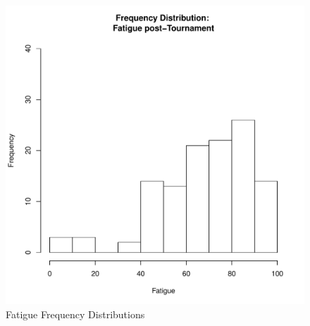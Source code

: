 \documentclass[12pt]{report}
\begin{document}
{\begin{figure}[htbp]
  \includegraphics[scale =.4]{../images/distFatiguePost.pdf}
  \caption{Fatigue Frequency Distributions}
  \label{fig:fatigueDist}
\end{figure}



}
\end{document}
